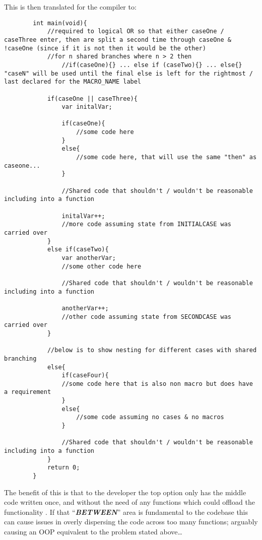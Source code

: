 \documentclass{article}
\newcommand{\textbfit}[1]{\textbf{\textit{#1}}}
\newcommand{\clfootnote}[3]{\color{#2}{\footnote{\label{#1}{ \color{#2}{#3}}}}\color{defaultcolor}}
\begin{document}
    \newpage
        This is then translated for the compiler to:

    \begin{lstlisting}
        int main(void){
            //required to logical OR so that either caseOne / caseThree enter, then are split a second time through caseOne & !caseOne (since if it is not then it would be the other)
            //for n shared branches where n > 2 then
                //if(caseOne){} ... else if (caseTwo){} ... else{} "caseN" will be used until the final else is left for the rightmost / last declared for the MACRO_NAME label
            
            if(caseOne || caseThree){
                var initalVar;

                if(caseOne){
                    //some code here
                }
                else{
                    //some code here, that will use the same "then" as caseone...
                }

                //Shared code that shouldn't / wouldn't be reasonable including into a function

                initalVar++;
                //more code assuming state from INITIALCASE was carried over
            }
            else if(caseTwo){
                var anotherVar;
                //some other code here

                //Shared code that shouldn't / wouldn't be reasonable including into a function

                anotherVar++;
                //other code assuming state from SECONDCASE was carried over
            }

            //below is to show nesting for different cases with shared branching
            else{
                if(caseFour){
                //some code here that is also non macro but does have a requirement
                }
                else{
                    //some code assuming no cases & no macros
                }

                //Shared code that shouldn't / wouldn't be reasonable including into a function
            }
            return 0;
        }
    \end{lstlisting}
    
        The benefit of this is that to the developer the top option only has the middle code written once, and without the need of any functions which could offload the functionality \clfootnote{HelperFuncNote}{blue}{Although helper functions in the case where they are truly non-fundamental \& ``off-loadable'' are fine}. If that ``\textbfit{BETWEEN}'' area is fundamental to the codebase this can cause issues in overly dispersing the code across too many functions; arguably causing an OOP equivalent to the problem stated above\dots
\end{document}
